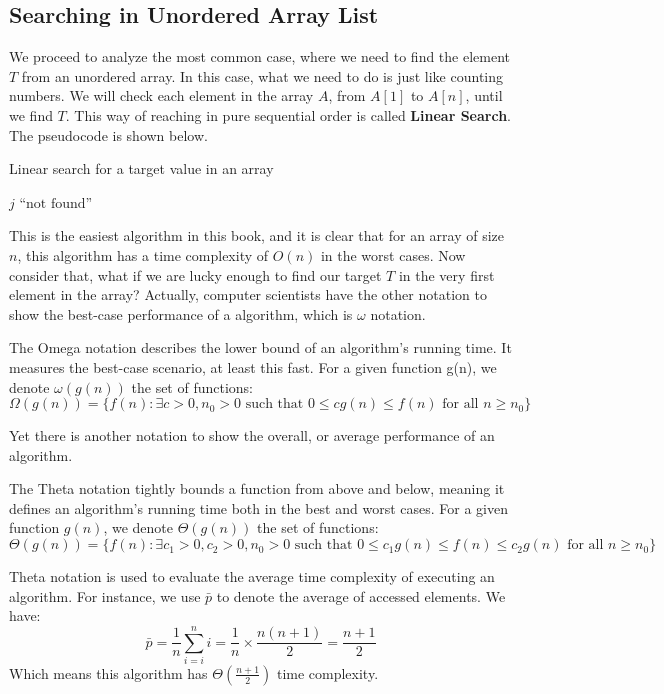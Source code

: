     \subsection{Searching in Unordered Array List}
    We proceed to analyze the most common case, where we need to find the element $T$ from an unordered 
    array. In this case, what we need to do is just like counting numbers. We will check each element in
    the array $A$, from $A[1]$ to $A[n]$, until we find $T$. This way of reaching in pure sequential 
    order is called \textbf{Linear Search}. The pseudocode is shown below.
    \begin{algorithm}
        \caption{Linear search for a target value in an array}
        \begin{algorithmic}[1]
                    \State \Return $j$
                \EndIf
            \EndFor
            \State \Return $\text{``not found''}$
        \EndProcedure
        \end{algorithmic}
        \end{algorithm} 
    This is the easiest  algorithm in this book, and it is clear that for an array of size $n$, this 
    algorithm has a time complexity of $O(n)$ in the worst cases. Now consider that, what if we are lucky
    enough to find our target $T$ in the very first element in the array? Actually, computer scientists
    have the other notation to show the best-case performance of a algorithm, which is $\omega$ notation.
    \begin{notation}
        The Omega notation describes the lower bound of an algorithm's running time. 
        It measures the best-case scenario, at least this fast. For a given function g(n), 
        we denote $\omega(g(n))$ the set of functions:
        \[
        \Omega(g(n)) = \{ f(n) : \exists c > 0, n_0 > 0 \text{ such that } 0 \leq cg(n) \leq f(n) \text{ for all } n \geq n_0 \}
        \]
    \end{notation}
    Yet there is another notation to show the overall, or average performance of an algorithm.
    \begin{notation}
        The Theta notation tightly bounds a function from above and below, meaning it defines an algorithm's running time both in the best and worst cases. For a given function $g(n)$, we denote $\Theta(g(n))$ the set of functions:
        \[
        \Theta(g(n)) = \{ f(n) : \exists c_1 > 0, c_2 > 0, n_0 > 0 \text{ such that } 0 \leq c_1g(n) \leq f(n) \leq c_2g(n) \text{ for all } n \geq n_0 \}
        \]
    \end{notation}
    Theta notation is used to evaluate the average time complexity of executing an algorithm. For instance,
    we use $\bar{p}$ to denote the average of accessed elements. We have:
    $$\bar{p} = \frac{1}{n} \sum_{i=i}^{n}i = \frac{1}{n}\times\frac{n(n+1)}{2}=\frac{n+1}{2}$$
    Which means this algorithm has $\Theta(\frac{n+1}{2})$ time complexity.
